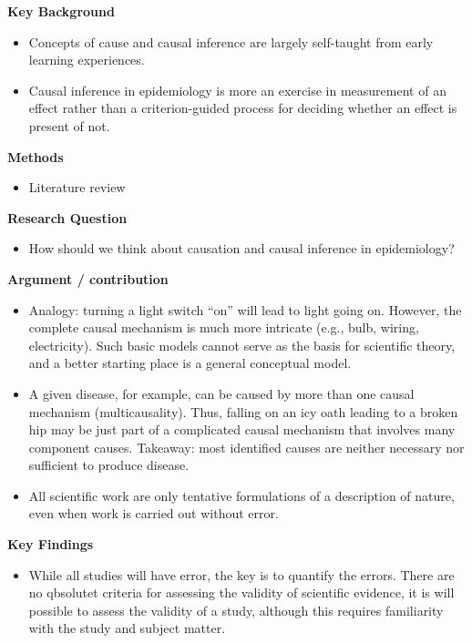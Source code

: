 \documentclass[
]{book}
\providecommand{\tightlist}{%
  \setlength{\itemsep}{0pt}\setlength{\parskip}{0pt}}
\begin{document}
\textbf{Key Background}

\begin{itemize}
\tightlist
\item
  Concepts of cause and causal inference are largely self-taught from early learning experiences.
\item
  Causal inference in epidemiology is more an exercise in measurement of an effect rather than a criterion-guided process for deciding whether an effect is present of not.
\end{itemize}

\textbf{Methods}

\begin{itemize}
\tightlist
\item
  Literature review
\end{itemize}

\textbf{Research Question}

\begin{itemize}
\tightlist
\item
  How should we think about causation and causal inference in epidemiology?
\end{itemize}

\textbf{Argument / contribution}

\begin{itemize}
\tightlist
\item
  Analogy: turning a light switch ``on'' will lead to light going on. However, the complete causal mechanism is much more intricate (e.g., bulb, wiring, electricity). Such basic models cannot serve as the basis for scientific theory, and a better starting place is a general conceptual model.
\item
  A given disease, for example, can be caused by more than one causal mechanism (multicausality). Thus, falling on an icy oath leading to a broken hip may be just part of a complicated causal mechanism that involves many component causes. Takeaway: most identified causes are neither necessary nor sufficient to produce disease.
\item
  All scientific work are only tentative formulations of a description of nature, even when work is carried out without error.
\end{itemize}

\textbf{Key Findings}

\begin{itemize}
\tightlist
\item
  While all studies will have error, the key is to quantify the errors. There are no qbsolutet criteria for assessing the validity of scientific evidence, it is will possible to assess the validity of a study, although this requires familiarity with the study and subject matter.
\end{itemize}
\end{document}
